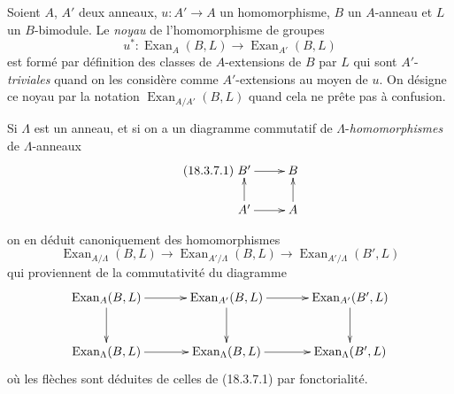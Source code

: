 \begin{env}[18.3.7]
\label{0.18.3.7-fr}
Soient $A$, $A'$ deux anneaux, $u:A'\to A$ un homomorphisme, $B$ un
$A$-anneau et $L$ un $B$-bimodule. Le \emph{noyau} de l'homomorphisme de
groupes
\[
  u^*:\operatorname{Exan}_A(B,L)\longrightarrow
  \operatorname{Exan}_{A'}(B,L)
\]
est formé par définition des classes de $A$-extensions de $B$ par $L$ qui
sont $A'$-\emph{triviales} quand on les considère comme $A'$-extensions au
moyen de $u$. On désigne ce noyau par la notation
$\operatorname{Exan}_{A/A'}(B,L)$ quand cela ne prête pas à confusion.

Si $\Lambda$ est un anneau, et si on a un diagramme commutatif de
$\Lambda$-\emph{homomorphismes} de $\Lambda$-anneaux
\begin{equation}
\label{0.18.3.7.1-fr}
\tag{18.3.7.1}
  \xymatrix@C=2pc@R=1.5pc{
    B'\ar[r] & B\\
    A'\ar[u]\ar[r] & A\ar[u]
  }
\end{equation}


on en déduit canoniquement des homomorphismes
\begin{equation}
\label{0.18.3.7.2-fr}
\tag{18.3.7.2}
  \operatorname{Exan}_{A/\Lambda}(B,L)\longrightarrow
  \operatorname{Exan}_{A'/\Lambda}(B,L)\longrightarrow
  \operatorname{Exan}_{A'/\Lambda}(B',L)
\end{equation}
qui proviennent de la commutativité du diagramme
\[
  \xymatrix@C=2.8pc@R=2.3pc{
    \operatorname{Exan}_A(B,L)\ar[r]\ar[d]
      & \operatorname{Exan}_{A'}(B,L)\ar[r]\ar[d]
      & \operatorname{Exan}_{A'}(B',L)\ar[d]\\
    \operatorname{Exan}_{\Lambda}(B,L)\ar[r]
      & \operatorname{Exan}_{\Lambda}(B,L)\ar[r]
      & \operatorname{Exan}_{\Lambda}(B',L)
  }
\]
où les flèches sont déduites de celles de (18.3.7.1) par fonctorialité.
\end{env}

